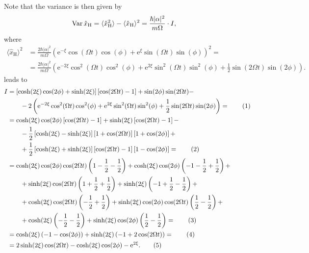 \documentclass[english, parskip=full]{scrartcl}
\newcommand\numberthis{\addtocounter{equation}{1}\tag{\theequation}}
\newcommand{\bra}{}
\newcommand{\kla}{}
\newcommand{\klam}{}
\newcommand{\tecxt}{}
\newcommand{\e}{\text{e}}
\begin{document}
Note that the variance is then given by
\begin{align}
\tecxt\text{Var\,}\hat{x}_\tecxt\text{H} &= \bra\langle \hat{x}_\tecxt\text{H}^2 \rangle - \bra\langle \hat{x}_\tecxt\text{H} \rangle^2 = \frac{\hbar|\alpha|^2}{m\Omega}\cdot I,
\end{align}
where 
\begin{align}
\bra\langle \hat{x}_\tecxt\text{H} \rangle^2 &= \frac{2\hbar|\alpha|^2}{m\Omega}\kla\left( \e^{-\xi}\cos (\Omega t)\cos(\phi) + \e^\xi\sin (\Omega t)\sin(\phi) \right)^2 = \\
&= \frac{2\hbar|\alpha|^2}{m\Omega}\kla\left( \e^{-2\xi}\cos^2(\Omega t)\cos^2(\phi) + \e^{2\xi}\sin^2(\Omega t)\sin^2(\phi) + \frac{1}{2}\sin(2\Omega t)\sin(2\phi) \right).
\end{align}
leads to
\begin{align*}
I &= \klam\left[ \cosh(2\xi)\cos(2\phi) + \sinh(2\xi) \right]\klam\left[ \cos(2\Omega t) - 1 \right] +  \sin (2\phi)\sin(2\Omega t) - \\
&\hspace{0.7cm} - 2\kla\left( \e^{-2\xi}\cos^2(\Omega t)\cos^2(\phi) + \e^{2\xi}\sin^2(\Omega t)\sin^2(\phi) + \frac{1}{2}\sin(2\Omega t)\sin(2\phi) \right) = \numberthis \\
&= \cosh(2\xi)\cos(2\phi)\klam\left[ \cos(2\Omega t) - 1 \right] + \sinh(2\xi)\klam\left[ \cos(2\Omega t) - 1 \right] -  \\
&\hspace{0.7cm} - \frac{1}{2}\klam\left[ \cosh(2\xi) - \sinh(2\xi) \right] \klam\left[ 1 + \cos (2\Omega t) \right]\klam\left[ 1 + \cos(2\phi) \right] + \\
&\hspace{0.7cm} + \frac{1}{2}\klam\left[ \cosh(2\xi) + \sinh(2\xi) \right] \klam\left[ \cos (2\Omega t) - 1 \right]\klam\left[ 1 - \cos(2\phi) \right] = \numberthis \\
&= \cosh(2\xi) \cos(2\phi)\cos(2\Omega t)\kla\left( 1 - \frac{1}{2} - \frac{1}{2} \right) + \cosh(2\xi)\cos(2\phi) \kla\left(  -1 -\frac{1}{2} + \frac{1}{2} \right) + \\
&\hspace{0.7cm} + \sinh (2\xi)\cos(2\Omega t)\kla\left( 1 + \frac{1}{2} + \frac{1}{2} \right) + \sinh(2\xi)\kla\left( -1 + \frac{1}{2} - \frac{1}{2} \right) + \\
&\hspace{0.7cm} + \cosh(2\xi)\cos(2\Omega t)\kla\left( -\frac{1}{2} + \frac{1}{2} \right) + \sinh(2\xi)\cos(2\phi)\cos(2\Omega t)\kla\left( \frac{1}{2} - \frac{1}{2} \right) + \\
&\hspace{0.7cm} + \cosh(2\xi)\kla\left( -\frac{1}{2} - \frac{1}{2} \right) + \sinh(2\xi)\cos(2\phi)\kla\left( \frac{1}{2} - \frac{1}{2} \right) = \numberthis\\
&= \cosh(2\xi)\kla\left( -1 - \cos(2\phi) \right) + \sinh(2\xi)\kla\left( -1 + 2\cos(2\Omega t) \right) =  \numberthis\\
&= 2\sinh(2\xi)\cos(2\Omega t) - \cosh(2\xi)\cos(2\phi) -\e^{2\xi}. \numberthis
\end{align*}
\end{document}
